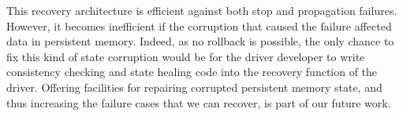 \documentclass[times, 10pt, twocolumn]{article}
\begin{document}
This recovery architecture is efficient against both stop and propagation failures. However, it becomes inefficient if the corruption that caused the failure affected data in persistent memory. Indeed, as no rollback is possible, the only chance to fix this kind of state corruption would be for the driver developer to write consistency checking and state healing code into the recovery function of the driver. Offering facilities for repairing corrupted persistent memory state, and thus increasing the failure cases that we can recover, is part of our future work.



\end{document}
